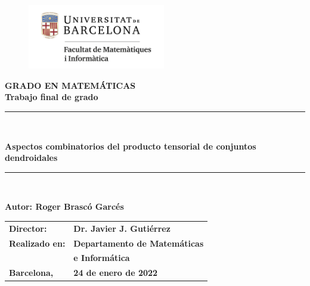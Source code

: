 \documentclass[11pt,a4paper,openright,oneside]{article}
\numberwithin{equation}{section}
\theoremstyle{definition}
\begin{document}
\thispagestyle{empty}


\begin{titlepage}
    \begin{center}
        \begin{figure}[htb]
            \begin{center}
                \includegraphics[width=6cm]{matematiquesinformatica-pos-rgb.png}
            \end{center}
        \end{figure}
        \vspace*{1cm}
        \textbf{\LARGE GRADO EN MATEM\'{A}TICAS } \\
        \vspace*{.5cm}
        \textbf{\LARGE Trabajo final de grado} \\
        \vspace*{1.5cm}
        \rule{16cm}{0.1mm}\\
        \begin{Huge}
            \textbf{Aspectos combinatorios del producto tensorial de conjuntos dendroidales} \\
        \end{Huge}
        \rule{16cm}{0.1mm}\\
        \vspace{1cm}
        \begin{flushright}
            \textbf{\LARGE Autor: Roger Brasc\'o Garc\'es}
            \vspace*{2cm}
            \renewcommand{\arraystretch}{1.5}
            \begin{tabular}{ll}
                \textbf{\Large Director:}     & \textbf{\Large Dr. Javier J. Guti\'errez }     \\
                \textbf{\Large Realizado en:} & \textbf{\Large  Departamento de Matem\'aticas} \\
                                              & \textbf{\Large e Inform\'atica}                \\
                \textbf{\Large Barcelona,}    & \textbf{\Large 24 de enero de 2022 }
            \end{tabular}
        \end{flushright}
    \end{center}
\end{titlepage}
\newpage
\end{document}
